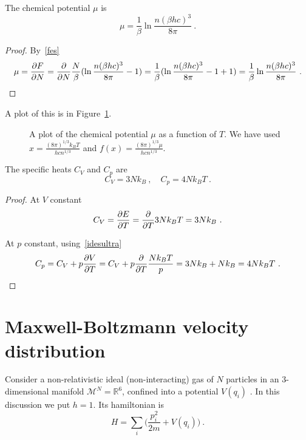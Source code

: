     The chemical potential $\mu$ is 
    \begin{equation*}
        \mu = \frac{1}{\beta} \ln \frac{n (\beta h c)^3}{8\pi} ~.
    \end{equation*}
    \begin{proof}
        By~\eqref{fes}
        \begin{equation*}
            \mu = \frac{\partial F}{\partial N} = \frac{\partial}{\partial N} \frac{N}{\beta} (\ln \frac{n (\beta h c)^3}{8\pi} - 1) = \frac{1}{\beta} (\ln \frac{n (\beta h c)^3}{8\pi} - 1 + 1) = \frac{1}{\beta} \ln \frac{n (\beta h c)^3}{8\pi} ~.
        \end{equation*}
    \end{proof}
    A plot of this is in Figure~\ref{can:mu3}.
    \begin{figure}
        \centering
        \caption{A plot of the chemical potential $\mu$ as a function of $T$. We have used $x = \frac{(8 \pi)^{1/3} k_B T}{h c n^{1/3}}$ and $f(x) = \frac{(8 \pi)^{1/3} \mu}{h c n^{1/3}}$.}
        \label{can:mu3}
    \end{figure}

    The specific heats $C_V$ and $C_p$ are 
    \begin{equation*}
        C_V = 3 N k_B ~, \quad C_p = 4 N k_B T ~. 
    \end{equation*}
    \begin{proof}
        At $V$ constant
        \begin{equation*}
            C_V = \frac{\partial E}{\partial T} = \frac{\partial}{\partial T} 3 N k_B T = 3 N k_B ~.
        \end{equation*}

        At $p$ constant, using~\eqref{idesultra}
        \begin{equation*}
            C_p = C_V + p \frac{\partial V}{\partial T} =  C_V + p \frac{\partial}{\partial T} \frac{N k_B T}{p} = 3 N k_B + N k_B = 4 N k_B T ~.
        \end{equation*}
    \end{proof}

\section{Maxwell-Boltzmann velocity distribution}

    Consider a non-relativistic ideal (non-interacting) gas of $N$ particles in an $3$-dimensional manifold $\mathcal M^N = \mathbb R^6$, confined into a potential $V(q_i)$ . In this discussion we put $h = 1$. Its hamiltonian is 
    \begin{equation*}
        H = \sum_i \Big ( \frac{p^2_i}{2m} + V(q_i) \Big ) ~.
    \end{equation*}

